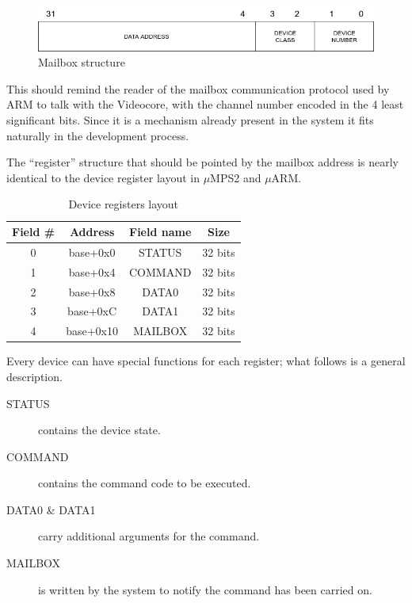 \documentclass[12pt,a4paper,openright,twoside]{report}
\begin{document}
\begin{figure}[h]
\includegraphics[scale=0.571]{images/tesi5.png}
\caption[Mailbox Structure]{Mailbox structure}\label{fig:mailbox}
\end{figure}

This should remind the reader of the mailbox communication protocol used by ARM
to talk with the Videocore, with the channel number encoded in the 4 least significant
bits. Since it is a mechanism already present in the system it fits naturally
in the development process.

The ``register'' structure that should be pointed by the mailbox address is nearly 
identical to the device register layout in $\mu$MPS2 and $\mu$ARM.

\begin{table}[h]
\begin{center}
    \begin{tabular}{|c|c|c|c|}
    \hline
    \rowcolor[HTML]{C0C0C0} 
    Field \# & Address   & Field name & Size    \\ \hline
    0        & base+0x0  & STATUS     & 32 bits \\ \hline
    1        & base+0x4  & COMMAND    & 32 bits \\ \hline
    2        & base+0x8  & DATA0      & 32 bits \\ \hline
    3        & base+0xC  & DATA1      & 32 bits \\ \hline
    4        & base+0x10 & MAILBOX    & 32 bits \\ \hline
    \end{tabular}
 \caption[Device Registers Layout]{Device registers layout}\label{tab:reg}
\end{center}
\end{table}

Every device can have special functions for each register; what follows is a
general description.
\begin{description}
    \item[STATUS] contains the device state.
    \item[COMMAND] contains the command code to be executed.
    \item[DATA0 \& DATA1] carry additional arguments for the command.
    \item[MAILBOX] is written by the system to notify the command has been carried on.
\end{description}
\end{document}

